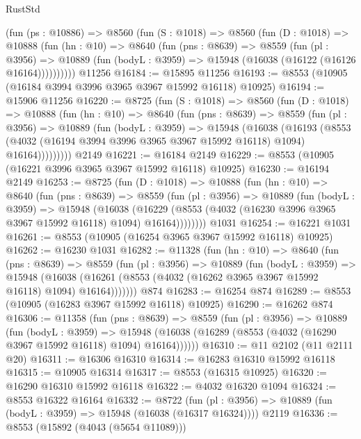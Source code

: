 \begin{lexlean}{RustStd}
\begin{coremodule}
    (fun (ps : @10886) =>
    @8560
      (fun (S : @1018) =>
      @8560
        (fun (D : @1018) =>
        @10888
          (fun (hn : @10) =>
          @8640
            (fun (pns : @8639) =>
            @8559
              (fun (pl : @3956) =>
              @10889 (fun (bodyL : @3959) => @15948 (@16038 (@16122 (@16126 @16164))))))))))
    @11256
@16184 := @15895 @11256
@16193 := @8553 (@10905 (@16184 @3994 @3996 @3965 @3967 @15992 @16118) @10925)
@16194 := @15906 @11256
@16220 := @8725
    (fun (S : @1018) =>
    @8560
      (fun (D : @1018) =>
      @10888
        (fun (hn : @10) =>
        @8640
          (fun (pns : @8639) =>
          @8559
            (fun (pl : @3956) =>
            @10889
              (fun (bodyL : @3959) =>
              @15948
                (@16038
                  (@16193
                    (@8553
                      (@4032 (@16194 @3994 @3996 @3965 @3967 @15992 @16118) @1094)
                      @16164)))))))))
    @2149
@16221 := @16184 @2149
@16229 := @8553 (@10905 (@16221 @3996 @3965 @3967 @15992 @16118) @10925)
@16230 := @16194 @2149
@16253 := @8725
    (fun (D : @1018) =>
    @10888
      (fun (hn : @10) =>
      @8640
        (fun (pns : @8639) =>
        @8559
          (fun (pl : @3956) =>
          @10889
            (fun (bodyL : @3959) =>
            @15948
              (@16038
                (@16229 (@8553 (@4032 (@16230 @3996 @3965 @3967 @15992 @16118) @1094) @16164))))))))
    @1031
@16254 := @16221 @1031
@16261 := @8553 (@10905 (@16254 @3965 @3967 @15992 @16118) @10925)
@16262 := @16230 @1031
@16282 := @11328
    (fun (hn : @10) =>
    @8640
      (fun (pns : @8639) =>
      @8559
        (fun (pl : @3956) =>
        @10889
          (fun (bodyL : @3959) =>
          @15948
            (@16038 (@16261 (@8553 (@4032 (@16262 @3965 @3967 @15992 @16118) @1094) @16164)))))))
    @874
@16283 := @16254 @874
@16289 := @8553 (@10905 (@16283 @3967 @15992 @16118) @10925)
@16290 := @16262 @874
@16306 := @11358
    (fun (pns : @8639) =>
    @8559
      (fun (pl : @3956) =>
      @10889
        (fun (bodyL : @3959) =>
        @15948 (@16038 (@16289 (@8553 (@4032 (@16290 @3967 @15992 @16118) @1094) @16164))))))
@16310 := @11 @2102 (@11 @2111 @20)
@16311 := @16306 @16310
@16314 := @16283 @16310 @15992 @16118
@16315 := @10905 @16314
@16317 := @8553 (@16315 @10925)
@16320 := @16290 @16310 @15992 @16118
@16322 := @4032 @16320 @1094
@16324 := @8553 @16322 @16164
@16332 := @8722
    (fun (pl : @3956) => @10889 (fun (bodyL : @3959) => @15948 (@16038 (@16317 @16324))))
    @2119
@16336 := @8553 (@15892 (@4043 (@5654 @11089)))

\end{coremodule}
\end{lexlean}

